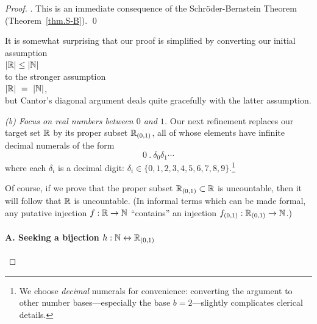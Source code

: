\begin{proof}
.
This is an immediate consequence of the Schr\"{o}der-Bernstein Theorem
(Theorem~\ref{thm.S-B}).  \qed

\medskip

It is somewhat surprising that our proof is simplified by converting
our initial assumption \\
\hspace*{.35in}$|\mathbb{R}| \leq |\mathbb{N}|$ \\
to the stronger assumption \\
\hspace*{.35in}$|\mathbb{R}| \ = \ |\mathbb{N}|$,  \\
but Cantor's diagonal argument deals quite gracefully with the latter
assumption.

\medskip

{\it (b) Focus on real numbers between $0$ and $1$.}
Our next refinement replaces our target set $\mathbb{R}$ by its proper subset
$\mathbb{R}_{(0,1)}$, all of whose elements have infinite decimal numerals of
the form
\[ 0 \ . \ \delta_0 \delta_1 \cdots \]
where each $\delta_i$ is a decimal digit: $\delta_i \in \{0, 1, 2, 3,
4, 5, 6, 7, 8, 9\}$.\footnote{We choose {\em decimal} numerals for
  convenience: converting the argument to other number
  bases---especially the base $b=2$---slightly complicates clerical
  details.}

Of course, if we prove that the proper subset $\mathbb{R}_{(0,1)} \subset \mathbb{R}$
is uncountable, then it will follow that $\mathbb{R}$ is uncountable.  (In
informal terms which can be made formal, any putative injection $f: \mathbb{R}
\rightarrow \mathbb{N}$ ``contains'' an injection $f_{(0,1)}: \mathbb{R}_{(0,1)}
\rightarrow \mathbb{N}$.)

\paragraph{\small\sf A. Seeking a bijection $h: \mathbb{N} \leftrightarrow \mathbb{R}_{(0,1)}$}


\end{proof}
